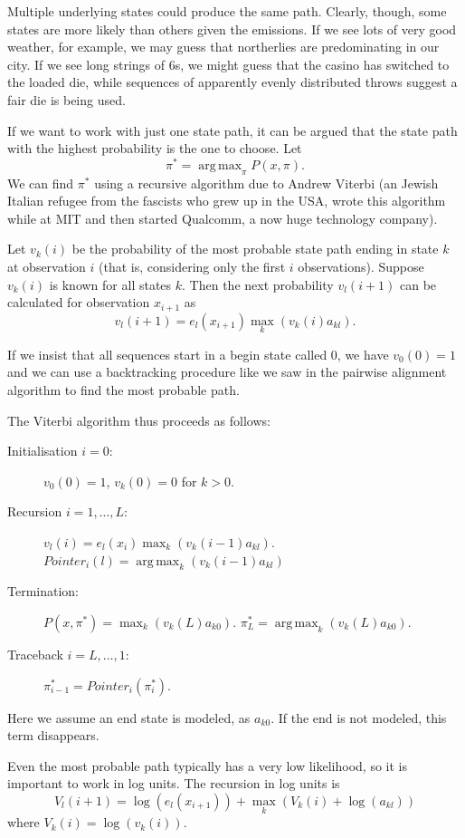 \documentclass[11pt]{article}
\DeclareMathOperator*{\argmax}{arg\,max}
\begin{document}
Multiple underlying states could produce the same path.  Clearly, though, some states are more likely than others given the emissions.  If we see lots of very good weather, for example, we may guess that northerlies are predominating in our city.  If we see long strings of 6s, we might guess that the casino has switched to the loaded die, while sequences of apparently evenly distributed throws suggest a fair die is being used.  

If we want to work with just one state path, it can be argued that the state path with the highest probability is the one to choose.  Let
\[ \pi^* = \argmax_{\pi} P(x,\pi). \]
We can find $\pi^*$ using a recursive algorithm due to Andrew Viterbi (an  Jewish Italian refugee from the fascists who grew up in the USA, wrote this algorithm while at MIT and then started Qualcomm, a now huge technology company).   

Let $v_k(i)$ be the probability of the most probable state path ending in state $k$ at observation $i$ (that is, considering only the first $i$ observations).  Suppose  $v_k(i)$ is known for all states $k$.  Then the next probability $v_l(i+1)$ can be calculated for observation $x_{i+1}$ as 
\[v_l(i+1) = e_l(x_{i+1}) \max_k (v_k(i)a_{kl}).\]

If we insist that all sequences start in a begin state called 0, we have $v_0(0) = 1$ and we can use a backtracking procedure like we saw in the pairwise alignment algorithm to find the most probable path.

The Viterbi algorithm thus proceeds as follows:
\begin{description}
\item[Initialisation $i = 0$:] $v_0(0) = 1$, $v_k(0) = 0$ for $k>0$.
\item[Recursion $i = 1,\ldots,L$:] $v_l(i) = e_l(x_i) \max_k(v_k(i-1)a_{kl})$. \\ $Pointer_i(l) = \argmax_k(v_k(i-1)a_{kl})$
\item[Termination:] $P(x,\pi^*) = \max_k (v_k(L)a_{k0})$. $ \pi^*_L = \argmax_k(v_k(L)a_{k0})$.
\item[Traceback $i = L,\ldots,1$:] $\pi_{i-1}^* = Pointer_i(\pi_i^*)$.
\end{description}
Here we assume an end state is modeled, as $a_{k0}$.  If the end is not modeled, this term disappears.


Even the most probable path typically has a very low likelihood, so it is important to work in log units.  The recursion in log units is \[ V_l(i+1) = \log (e_l(x_{i+1})) + \max_k (V_k(i) + \log(a_{kl}))\]
where $V_k(i) = \log(v_k(i))$.
\end{document}
